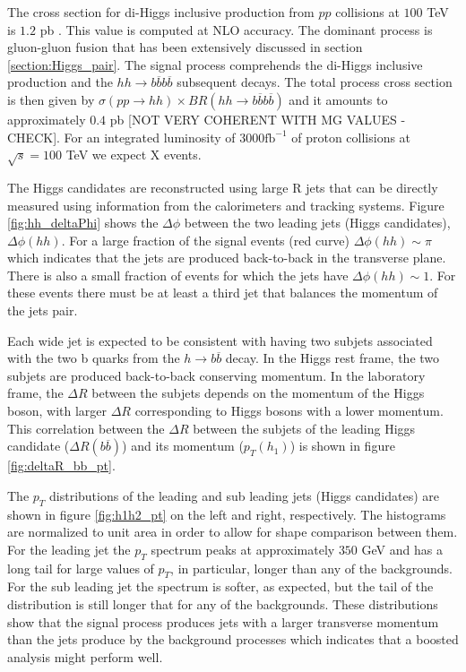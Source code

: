 The cross section for di-Higgs inclusive production from $pp$ collisions at $100$ TeV is $1.2$ pb \cite{FCCphys}. This value is computed at NLO accuracy. The dominant process is gluon-gluon fusion that has been extensively discussed in section \ref{section:Higgs_pair}. The signal process comprehends the di-Higgs inclusive production and the $hh\rightarrow b\overline{b}b\overline{b}$ subsequent decays. The total process cross section is then given by $\sigma(pp\rightarrow hh)\times BR(hh\rightarrow b\overline{b}b\overline{b})$ and it amounts to approximately $0.4$ pb [NOT VERY COHERENT WITH MG VALUES - CHECK]. For an integrated luminosity of $3000\text{fb}^{-1}$ of proton collisions at $\sqrt{s}=100$ TeV we expect X events.

The Higgs candidates are reconstructed using large R jets that can be directly measured using information from the calorimeters and tracking systems. Figure \ref{fig:hh_deltaPhi} shows the $\Delta\phi$ between the two leading jets (Higgs candidates), $\Delta\phi(hh)$. For a large fraction of the signal events (red curve) $\Delta\phi(hh)\sim \pi$ which indicates that the jets are produced back-to-back in the transverse plane. There is also a small fraction of events for which the jets have $\Delta\phi(hh)\sim 1$. For these events there must be at least a third jet that balances the momentum of the jets pair. 

Each wide jet is expected to be consistent with having two subjets associated with the two b quarks from the $h\rightarrow b\overline{b}$ decay. In the Higgs rest frame, the two subjets are produced back-to-back conserving momentum. In the laboratory frame, the $\Delta R$ between the subjets depends on the momentum of the Higgs boson, with larger $\Delta R$ corresponding to Higgs bosons with a lower momentum. This correlation between the $\Delta R$ between the subjets of the leading Higgs candidate ($\Delta R(b\overline{b})$) and its momentum ($p_T(h_1)$) is shown in figure \ref{fig:deltaR_bb_pt}. 

The $p_T$ distributions of the leading and sub leading jets (Higgs candidates) are shown in figure \ref{fig:h1h2_pt} on the left and right, respectively. The histograms are normalized to unit area in order to allow for shape comparison between them. For the leading jet the $p_T$ spectrum peaks at approximately $350$ GeV and has a long tail for large values of $p_T$, in particular, longer than any of the backgrounds. For the sub leading jet the spectrum is softer, as expected, but the tail of the distribution is still longer that for any of the backgrounds. These distributions show that the signal process produces jets with a larger transverse momentum than the jets produce by the background processes which indicates that a boosted analysis might perform well.

